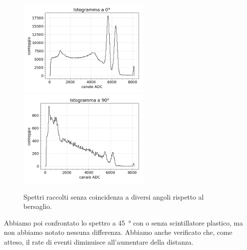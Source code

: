 \begin{figure}[h]
	\centering
	\newcommand*\mywidth{17.5em}

	\subfloat
	{\includegraphics[width=\mywidth]{0g}}
	\hfill
	\subfloat
	{\includegraphics[width=\mywidth]{90g}}

	\caption{Spettri raccolti senza coincidenza a diversi angoli rispetto al bersaglio.}
	\label{4ang}
\end{figure}

Abbiamo poi confrontato lo spettro a \SI{45}{\degree} con o senza scintillatore plastico, ma non abbiamo notato nessuna differenza. Abbiamo anche verificato che, come atteso, il rate di eventi diminuisce all'aumentare della distanza.

